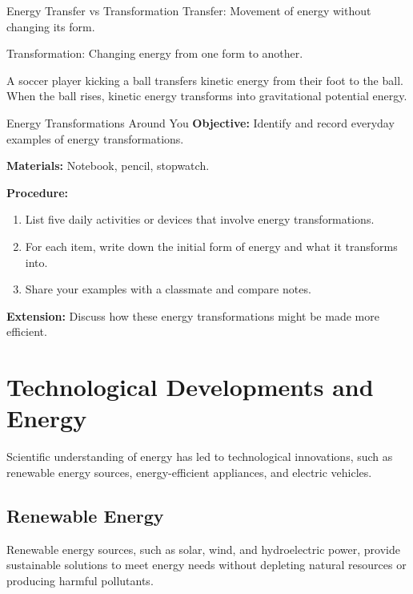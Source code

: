 \begin{keyconcept}{Energy Transfer vs Transformation}
Transfer: Movement of energy without changing its form.

Transformation: Changing energy from one form to another.
\end{keyconcept}

\begin{example}
A soccer player kicking a ball transfers kinetic energy from their foot to the ball. When the ball rises, kinetic energy transforms into gravitational potential energy.
\end{example}

\begin{investigation}{Energy Transformations Around You}
\textbf{Objective:} Identify and record everyday examples of energy transformations.

\textbf{Materials:} Notebook, pencil, stopwatch.

\textbf{Procedure:}
\begin{enumerate}
\item List five daily activities or devices that involve energy transformations.
\item For each item, write down the initial form of energy and what it transforms into.
\item Share your examples with a classmate and compare notes.
\end{enumerate}

\textbf{Extension:} Discuss how these energy transformations might be made more efficient.
\end{investigation}

\section{Technological Developments and Energy}

Scientific understanding of energy has led to technological innovations, such as renewable energy sources, energy-efficient appliances, and electric vehicles.

\subsection{Renewable Energy}

Renewable energy sources, such as solar, wind, and hydroelectric power, provide sustainable solutions to meet energy needs without depleting natural resources or producing harmful pollutants.

